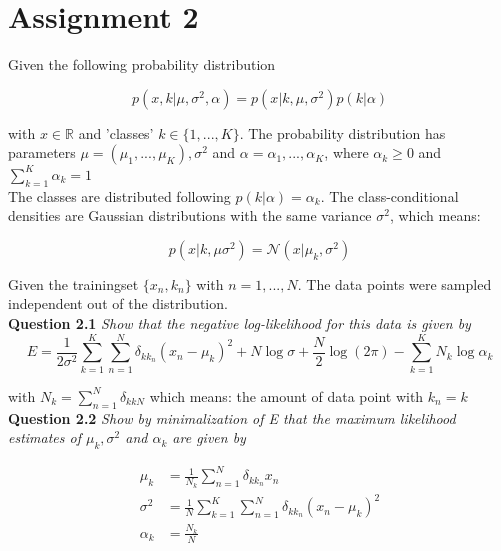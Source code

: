 \documentclass[a4paper]{article}
\begin{document}
\section*{Assignment 2}

Given the following probability distribution 

\begin{equation}
	p(x, k | \mu, \sigma^2, \alpha) = p(x | k, \mu, \sigma^2)p(k | \alpha)
\end{equation}

with $x \in \mathbb{R}$ and 'classes' $k \in \{ 1, ..., K\}$. The probability distribution has parameters $\mu = (\mu_1, ..., \mu_K), \sigma^2$ and $\alpha = \alpha_1, ..., \alpha_K$, where $\alpha_k \geq 0$ and $\sum_{k = 1}^K \alpha_k = 1$\\

The classes are distributed following $p(k | \alpha) = \alpha_k$. The class-conditional densities are Gaussian distributions with the same variance $\sigma^2$, which means:

\begin{equation}
	p(x | k, \mu \sigma^2) = \mathcal{N}(x | \mu_k, \sigma^2)
\end{equation}

Given the trainingset $\{ x_n, k_n\}$ with $n = 1, ..., N$. The data points were sampled independent out of the distribution.\\

\textbf{Question 2.1}  \textit{Show that the negative log-likelihood for this data is given by}\\

\begin{equation}
	E = \frac{1}{2 \sigma^2} \sum_{k=1}^K \sum_{n=1}^N \delta_{kk_n}(x_n - \mu_k)^2 + N \log \sigma + \frac{N}{2} \log(2 \pi) - \sum_{k=1}^K N_k \log \alpha_k
\end{equation}

with $N_k = \sum_{n = 1}^N \delta_{kkN}$ which means: the amount of data point with $k_n = k$\\ 


\textbf{Question 2.2}  \textit{Show by minimalization of E that the maximum likelihood estimates of $\mu_k, \sigma^2$ and $\alpha_k$ are given by }

\begin{align*}
	\mu_k &= \frac{1}{N_k} \sum_{n = 1}^N \delta_{kk_n} x_n\\
	\sigma^2 &= \frac{1}{N} \sum_{k = 1}^K \sum_{n = 1}^N \delta_{kk_n} (x_n - \mu_k)^2\\
	\alpha_k &= \frac{N_k}{N}
\end{align*}
\end{document}
